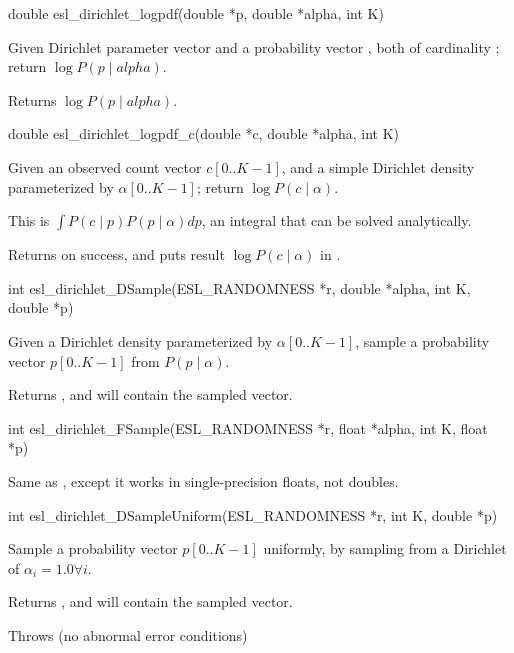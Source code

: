 \begin{sreapi}
\hypertarget{func:esl_dirichlet_logpdf()}
{\item[double esl\_dirichlet\_logpdf(double *p, double *alpha, int K)]}

Given Dirichlet parameter vector  and a probability
vector , both of cardinality ; return
$\log P(p \mid alpha)$.

Returns $\log P(p \mid alpha)$.



\hypertarget{func:esl_dirichlet_logpdf_c()}
{\item[double esl\_dirichlet\_logpdf\_c(double *c, double *alpha, int K)]}

Given an observed count vector $c[0..K-1]$, 
and a simple Dirichlet density parameterized by
$\alpha[0..K-1]$;
return $\log P(c \mid \alpha)$.

This is $\int P(c \mid p) P(p \mid \alpha) dp$,
an integral that can be solved analytically.

Returns  on success, and puts result $\log P(c \mid \alpha)$
in .


\hypertarget{func:esl_dirichlet_DSample()}
{\item[int esl\_dirichlet\_DSample(ESL\_RANDOMNESS *r, double *alpha, int K, double *p)]}

Given a Dirichlet density parameterized by $\alpha[0..K-1]$,
sample a probability vector $p[0..K-1]$ from
$P(p \mid \alpha)$.

Returns , and  will contain the sampled vector.


\hypertarget{func:esl_dirichlet_FSample()}
{\item[int esl\_dirichlet\_FSample(ESL\_RANDOMNESS *r, float *alpha, int K, float *p)]}

Same as , except it
works in single-precision floats, not doubles.


\hypertarget{func:esl_dirichlet_DSampleUniform()}
{\item[int esl\_dirichlet\_DSampleUniform(ESL\_RANDOMNESS *r, int K, double *p)]}

Sample a probability vector $p[0..K-1]$ uniformly, by
sampling from a Dirichlet of $\alpha_i = 1.0 \forall i$.

Returns , and  will contain the sampled vector.

Throws (no abnormal error conditions)



\end{sreapi}
